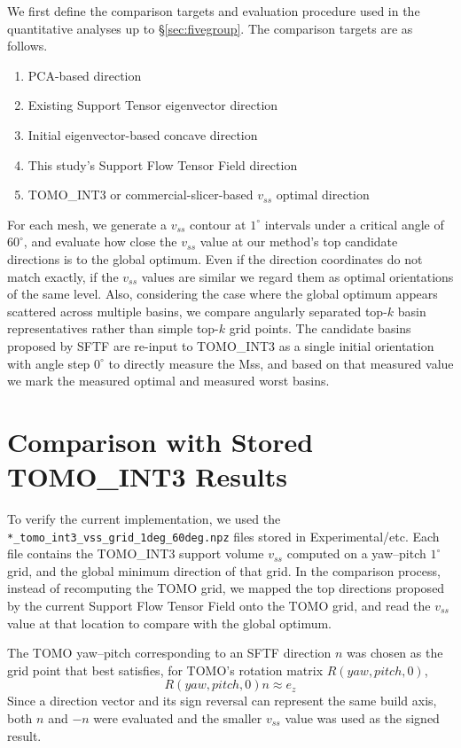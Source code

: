 \documentclass[11pt,a4paper]{article}
\begin{document}
We first define the comparison targets and evaluation procedure used in the quantitative analyses up to \S\ref{sec:fivegroup}.
The comparison targets are as follows.

\begin{enumerate}
\item PCA-based direction
\item Existing Support Tensor eigenvector direction
\item Initial eigenvector-based concave direction
\item This study's Support Flow Tensor Field direction
\item TOMO\_INT3 or commercial-slicer-based $v_{ss}$ optimal direction
\end{enumerate}

For each mesh, we generate a $v_{ss}$ contour at $1^\circ$ intervals under a critical angle of $60^\circ$,
and evaluate how close the $v_{ss}$ value at our method's top candidate directions is to the global optimum.
Even if the direction coordinates do not match exactly, if the $v_{ss}$ values are similar we regard them as optimal orientations of the same level.
Also, considering the case where the global optimum appears scattered across multiple basins,
we compare angularly separated top-$k$ basin representatives rather than simple top-$k$ grid points.
The candidate basins proposed by SFTF are re-input to TOMO\_INT3 as a single initial orientation with angle step $0^\circ$
to directly measure the Mss,
and based on that measured value we mark the measured optimal and measured worst basins.

\section{Comparison with Stored TOMO\_INT3 Results}

To verify the current implementation, we used the
\texttt{*\_tomo\_int3\_vss\_grid\_1deg\_60deg.npz} files stored in Experimental/etc.
Each file contains the TOMO\_INT3 support volume $v_{ss}$ computed on a yaw--pitch $1^\circ$ grid,
and the global minimum direction of that grid.
In the comparison process, instead of recomputing the TOMO grid,
we mapped the top directions proposed by the current Support Flow Tensor Field onto the TOMO grid,
and read the $v_{ss}$ value at that location to compare with the global optimum.

The TOMO yaw--pitch corresponding to an SFTF direction $n$ was chosen as the grid point that best satisfies,
for TOMO's rotation matrix $R(yaw,pitch,0)$,
\begin{equation}
R(yaw,pitch,0)n \approx e_z
\end{equation}
Since a direction vector and its sign reversal can represent the same build axis,
both $n$ and $-n$ were evaluated and the smaller $v_{ss}$ value was used as the signed result.
\end{document}

